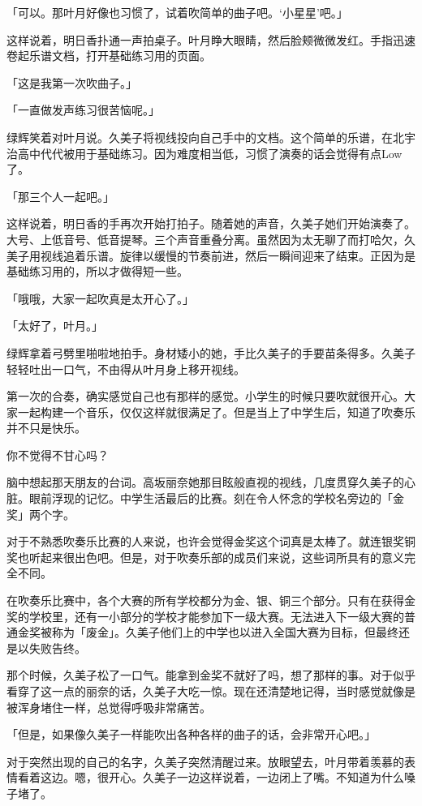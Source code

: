 \documentclass[UTF8]{ctexart}
\begin{document}
    「可以。那叶月好像也习惯了，试着吹简单的曲子吧。‘小星星’吧。」

    这样说着，明日香扑通一声拍桌子。叶月睁大眼睛，然后脸颊微微发红。手指迅速卷起乐谱文档，打开基础练习用的页面。

    「这是我第一次吹曲子。」

    「一直做发声练习很苦恼呢。」

    绿辉笑着对叶月说。久美子将视线投向自己手中的文档。这个简单的乐谱，在北宇治高中代代被用于基础练习。因为难度相当低，习惯了演奏的话会觉得有点Low了。

    「那三个人一起吧。」

    这样说着，明日香的手再次开始打拍子。随着她的声音，久美子她们开始演奏了。大号、上低音号、低音提琴。三个声音重叠分离。虽然因为太无聊了而打哈欠，久美子用视线追着乐谱。旋律以缓慢的节奏前进，然后一瞬间迎来了结束。正因为是基础练习用的，所以才做得短一些。

    「哦哦，大家一起吹真是太开心了。」

    「太好了，叶月。」

    绿辉拿着弓劈里啪啦地拍手。身材矮小的她，手比久美子的手要苗条得多。久美子轻轻吐出一口气，不由得从叶月身上移开视线。

    第一次的合奏，确实感觉自己也有那样的感觉。小学生的时候只要吹就很开心。大家一起构建一个音乐，仅仅这样就很满足了。但是当上了中学生后，知道了吹奏乐并不只是快乐。

    你不觉得不甘心吗？

    脑中想起那天朋友的台词。高坂丽奈她那目眩般直视的视线，几度贯穿久美子的心脏。眼前浮现的记忆。中学生活最后的比赛。刻在令人怀念的学校名旁边的「金奖」两个字。

    对于不熟悉吹奏乐比赛的人来说，也许会觉得金奖这个词真是太棒了。就连银奖铜奖也听起来很出色吧。但是，对于吹奏乐部的成员们来说，这些词所具有的意义完全不同。

    在吹奏乐比赛中，各个大赛的所有学校都分为金、银、铜三个部分。只有在获得金奖的学校里，还有一小部分的学校才能参加下一级大赛。无法进入下一级大赛的普通金奖被称为「废金」。久美子他们上的中学也以进入全国大赛为目标，但最终还是以失败告终。

    那个时候，久美子松了一口气。能拿到金奖不就好了吗，想了那样的事。对于似乎看穿了这一点的丽奈的话，久美子大吃一惊。现在还清楚地记得，当时感觉就像是被浑身堵住一样，总觉得呼吸非常痛苦。

    「但是，如果像久美子一样能吹出各种各样的曲子的话，会非常开心吧。」

    对于突然出现的自己的名字，久美子突然清醒过来。放眼望去，叶月带着羡慕的表情看着这边。嗯，很开心。久美子一边这样说着，一边闭上了嘴。不知道为什么嗓子堵了。
\end{document}
